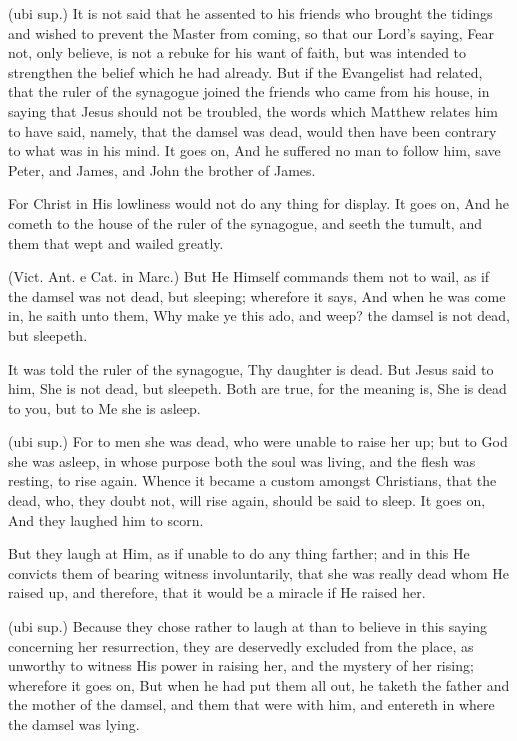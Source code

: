  (ubi sup.) It is not said that he assented to his friends who brought the tidings and wished to prevent the Master from coming, so that our Lord’s saying, Fear not, only believe, is not a rebuke for his want of faith, but was intended to strengthen the belief which he had already. But if the Evangelist had related, that the ruler of the synagogue joined the friends who came from his house, in saying that Jesus should not be troubled, the words which Matthew relates him to have said, namely, that the damsel was dead, would then have been contrary to what was in his mind. It goes on, And he suffered no man to follow him, save Peter, and James, and John the brother of James.

 For Christ in His lowliness would not do any thing for display. It goes on, And he cometh to the house of the ruler of the synagogue, and seeth the tumult, and them that wept and wailed greatly.

 (Vict. Ant. e Cat. in Marc.) But He Himself commands them not to wail, as if the damsel was not dead, but sleeping; wherefore it says, And when he was come in, he saith unto them, Why make ye this ado, and weep? the damsel is not dead, but sleepeth.

 It was told the ruler of the synagogue, Thy daughter is dead. But Jesus said to him, She is not dead, but sleepeth. Both are true, for the meaning is, She is dead to you, but to Me she is asleep.

 (ubi sup.) For to men she was dead, who were unable to raise her up; but to God she was asleep, in whose purpose both the soul was living, and the flesh was resting, to rise again. Whence it became a custom amongst Christians, that the dead, who, they doubt not, will rise again, should be said to sleep. It goes on, And they laughed him to scorn.

 But they laugh at Him, as if unable to do any thing farther; and in this He convicts them of bearing witness involuntarily, that she was really dead whom He raised up, and therefore, that it would be a miracle if He raised her.

 (ubi sup.) Because they chose rather to laugh at than to believe in this saying concerning her resurrection, they are deservedly excluded from the place, as unworthy to witness His power in raising her, and the mystery of her rising; wherefore it goes on, But when he had put them all out, he taketh the father and the mother of the damsel, and them that were with him, and entereth in where the damsel was lying.

